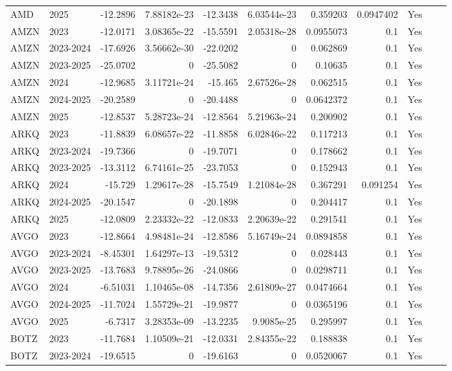 \begin{longtable}{llrrrrrrrrl}
AMD & 2025 & -12.2896 & 7.88182e-23 & -12.3438 & 6.03544e-23 & 0.359203 & 0.0947402 & Yes &  \\
AMZN & 2023 & -12.0171 & 3.08365e-22 & -15.5591 & 2.05318e-28 & 0.0955073 & 0.1 & Yes &  \\
AMZN & 2023-2024 & -17.6926 & 3.56662e-30 & -22.0202 & 0 & 0.062869 & 0.1 & Yes &  \\
AMZN & 2023-2025 & -25.0702 & 0 & -25.5082 & 0 & 0.10635 & 0.1 & Yes &  \\
AMZN & 2024 & -12.9685 & 3.11721e-24 & -15.465 & 2.67526e-28 & 0.062515 & 0.1 & Yes &  \\
AMZN & 2024-2025 & -20.2589 & 0 & -20.4488 & 0 & 0.0642372 & 0.1 & Yes &  \\
AMZN & 2025 & -12.8537 & 5.28723e-24 & -12.8564 & 5.21963e-24 & 0.200902 & 0.1 & Yes &  \\
ARKQ & 2023 & -11.8839 & 6.08657e-22 & -11.8858 & 6.02846e-22 & 0.117213 & 0.1 & Yes &  \\
ARKQ & 2023-2024 & -19.7366 & 0 & -19.7071 & 0 & 0.178662 & 0.1 & Yes &  \\
ARKQ & 2023-2025 & -13.3112 & 6.74161e-25 & -23.7053 & 0 & 0.152943 & 0.1 & Yes &  \\
ARKQ & 2024 & -15.729 & 1.29617e-28 & -15.7549 & 1.21084e-28 & 0.367291 & 0.091254 & Yes &  \\
ARKQ & 2024-2025 & -20.1547 & 0 & -20.1898 & 0 & 0.204417 & 0.1 & Yes &  \\
ARKQ & 2025 & -12.0809 & 2.23332e-22 & -12.0833 & 2.20639e-22 & 0.291541 & 0.1 & Yes &  \\
AVGO & 2023 & -12.8664 & 4.98481e-24 & -12.8586 & 5.16749e-24 & 0.0894858 & 0.1 & Yes &  \\
AVGO & 2023-2024 & -8.45301 & 1.64297e-13 & -19.5312 & 0 & 0.028443 & 0.1 & Yes &  \\
AVGO & 2023-2025 & -13.7683 & 9.78895e-26 & -24.0866 & 0 & 0.0298711 & 0.1 & Yes &  \\
AVGO & 2024 & -6.51031 & 1.10465e-08 & -14.7356 & 2.61809e-27 & 0.0474664 & 0.1 & Yes &  \\
AVGO & 2024-2025 & -11.7024 & 1.55729e-21 & -19.9877 & 0 & 0.0365196 & 0.1 & Yes &  \\
AVGO & 2025 & -6.7317 & 3.28353e-09 & -13.2235 & 9.9085e-25 & 0.295997 & 0.1 & Yes &  \\
BOTZ & 2023 & -11.7684 & 1.10509e-21 & -12.0331 & 2.84355e-22 & 0.188838 & 0.1 & Yes &  \\
BOTZ & 2023-2024 & -19.6515 & 0 & -19.6163 & 0 & 0.0520067 & 0.1 & Yes &  \\

\end{longtable}
